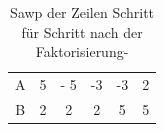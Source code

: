\documentclass[9pt]{article} %
\begin{document}
\begin{bsp}
\begin{table}[H]
            \centering
            \begin{tabular}{c|c|ccc|c}
                 A& 5 & - 5 & -3 & -3 & 2  \\
                 B& 2 & 2 & 2 & 5 & 5
            \end{tabular}
            \caption{Sawp der Zeilen Schritt für Schritt nach der Faktorisierung-}
            \label{tab:my_label}
        \end{table}
\end{bsp}
\end{document}
